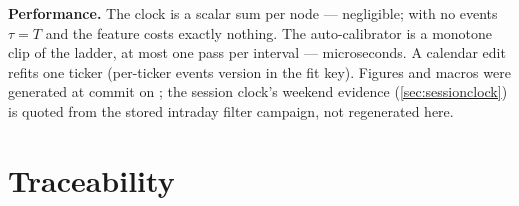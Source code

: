 \documentclass[11pt]{article}
\begin{document}
\noindent\textbf{Performance.}  The clock is a scalar sum per node ---
negligible; with no events $\tau=T$ and the feature costs exactly
nothing.  The auto-calibrator is a monotone clip of the ladder, at most
one pass per interval --- microseconds.  A calendar edit refits one ticker
(per-ticker events version in the fit key).  Figures and macros were
generated at commit \texttt{\emcgencommit} on \emcgendate; the session
clock's weekend evidence (\cref{sec:sessionclock}) is quoted from the
stored intraday filter campaign, not regenerated here.

\section{Traceability}
\label{app:trace}
\end{document}
